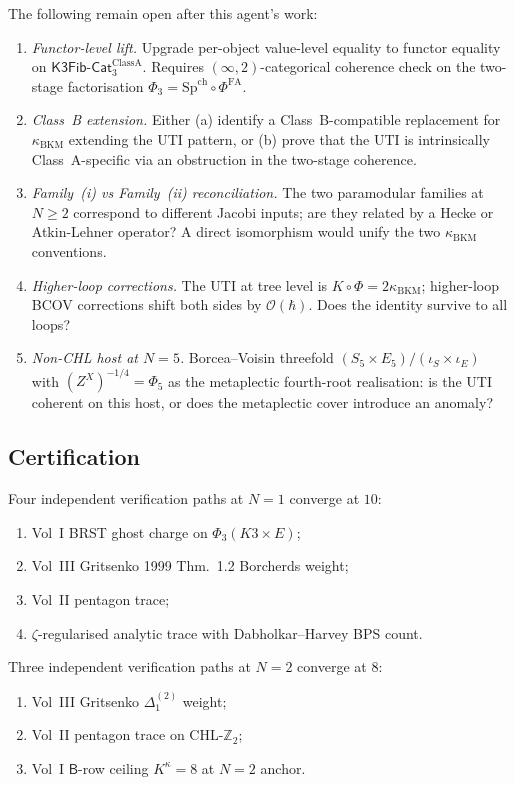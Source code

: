 \documentclass[11pt]{article}
\theoremstyle{definition}
\newcommand{\kBKM}{\kappa_{\mathrm{BKM}}}
\newcommand{\SpCh}{\mathrm{Sp}^{\mathrm{ch}}}
\newcommand{\PhiFA}{\Phi^{\mathrm{FA}}}
\begin{document}
The following remain open after this agent's work:

\begin{enumerate}
\item \emph{Functor-level lift.} Upgrade per-object value-level equality
to functor equality on $\mathsf{K3Fib}\text{-}\mathsf{Cat}_3^{\mathrm{Class A}}$.
Requires $(\infty, 2)$-categorical coherence check on the two-stage
factorisation $\Phi_3 = \SpCh \circ \PhiFA$.

\item \emph{Class~B extension.} Either (a) identify a Class~B-compatible
replacement for $\kBKM$ extending the UTI pattern, or (b) prove that
the UTI is intrinsically Class~A-specific via an obstruction in the
two-stage coherence.

\item \emph{Family~(i) vs Family~(ii) reconciliation.} The two
paramodular families at $N \geq 2$ correspond to different Jacobi
inputs; are they related by a Hecke or Atkin-Lehner operator? A direct
isomorphism would unify the two $\kBKM$ conventions.

\item \emph{Higher-loop corrections.} The UTI at tree level is
$K \circ \Phi = 2 \kBKM$; higher-loop BCOV corrections shift both sides
by $\mathcal{O}(\hbar)$. Does the identity survive to all loops?

\item \emph{Non-CHL host at $N = 5$.} Borcea--Voisin threefold
$(S_5 \times E_5)/(\iota_S \times \iota_E)$ with
$(Z^X)^{-1/4} = \Phi_5$ as the metaplectic fourth-root realisation:
is the UTI coherent on this host, or does the metaplectic cover introduce
an anomaly?
\end{enumerate}

\subsection{Certification}

Four independent verification paths at $N = 1$ converge at $10$:
\begin{enumerate}
\item Vol~I BRST ghost charge on $\Phi_3(K3 \times E)$;
\item Vol~III Gritsenko 1999 Thm.~1.2 Borcherds weight;
\item Vol~II pentagon trace;
\item $\zeta$-regularised analytic trace with Dabholkar--Harvey BPS count.
\end{enumerate}
Three independent verification paths at $N = 2$ converge at $8$:
\begin{enumerate}
\item Vol~III Gritsenko $\Delta_1^{(2)}$ weight;
\item Vol~II pentagon trace on CHL-$\mathbb{Z}_2$;
\item Vol~I $\mathsf{B}$-row ceiling $K^\kappa = 8$ at $N = 2$ anchor.
\end{enumerate}
\end{document}

